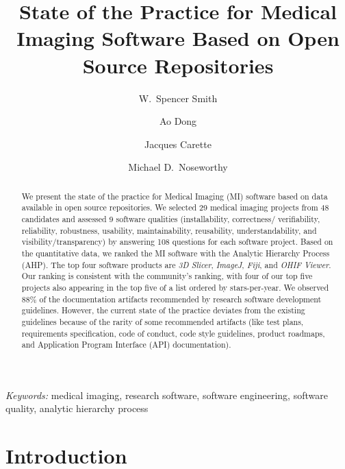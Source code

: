 \documentclass[11pt]{article}
\begin{document}
\title{State of the Practice for Medical Imaging Software Based on Open Source Repositories}

\author[1,*]{W.\ Spencer Smith}
\author[1]{Ao Dong}
\author[1]{Jacques Carette}
\author[2]{Michael D.\ Noseworthy}


\maketitle


\begin{abstract}

We present the state of the practice for Medical Imaging (MI) software based on
data available in open source repositories. We selected 29 medical imaging
projects from 48 candidates and assessed 9 software qualities (installability,
correctness/ verifiability, reliability, robustness, usability, maintainability,
reusability, understandability, and visibility/transparency) by answering 108
questions for each software project. Based on the quantitative data, we ranked
the MI software with the Analytic Hierarchy Process (AHP). The top four software
products are \textit{3D Slicer}, \textit{ImageJ}, \textit{Fiji}, and
\textit{OHIF Viewer}.  Our ranking is consistent with the community's
ranking, with four of our top five projects also appearing in the top five of a
list ordered by stars-per-year.  We observed 88\% of the documentation artifacts
recommended by research software development guidelines.  However, the current
state of the practice deviates from the existing guidelines because of the
rarity of some recommended artifacts (like test plans, requirements
specification, code of conduct, code style guidelines, product roadmaps, and
Application Program Interface (API) documentation).

\end{abstract}

\noindent \emph{Keywords:}
	medical imaging, research software, software engineering, software
	quality, analytic hierarchy process

\section{Introduction} \label{ch_intro}
\end{document}
